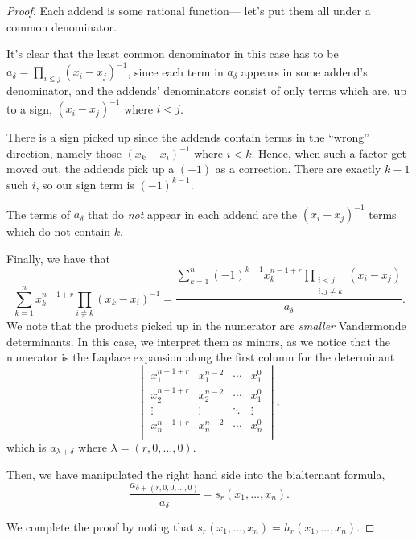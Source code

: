 \documentclass{article}
\begin{document}
\begin{proof}
    Each addend is some rational function--- let's put them all under a common denominator.

    It's clear that the least common denominator in this case has to be $a_\delta = \prod_{i\leq j}(x_i-x_j)^{-1}$, since each term in $a_\delta$ appears in some addend's denominator, and the addends' denominators consist of only terms which are, up to a sign, $(x_i-x_j)^{-1}$ where $i<j$.

    There is a sign picked up since the addends contain terms in the ``wrong'' direction, namely those $(x_k - x_i)^{-1}$ where $i < k$.
    Hence, when such a factor get moved out, the addends pick up a $(-1)$ as a correction. There are exactly $k-1$ such $i$, so our sign term is $(-1)^{k-1}$.

    The terms of $a_\delta$ that do \textit{not} appear in each addend are the $(x_i-x_j)^{-1}$ terms which do not contain $k$.

    Finally, we have that
    \[
        \sum_{k=1}^n x_k^{n-1+r}\prod_{i\neq k}(x_k-x_i)^{-1}
        =
        \frac{\displaystyle\sum_{k=1}^n (-1)^{k-1}x_k^{n-1+r}\prod_{\substack{i<j\\i,j\neq k}}(x_i-x_j)}{a_\delta}.
    \]
    We note that the products picked up in the numerator are \textit{smaller} Vandermonde determinants. In this case, we interpret them as minors, as we notice that the numerator is the Laplace expansion along the first column for the determinant
    \[
        \begin{vmatrix}
            x_1^{n-1+r} & x_1^{n-2} & \cdots & x_1^0 \\
            x_2^{n-1+r} & x_2^{n-2} & \cdots & x_1^0 \\
            \vdots & \vdots & \ddots & \vdots  \\
            x_n^{n-1+r} & x_n^{n-2} & \cdots & x_n^0 \\
        \end{vmatrix},
    \]
    which is $a_{\lambda + \delta}$ where $\lambda = (r,0,\ldots,0)$.

    Then, we have manipulated the right hand side into the bialternant formula,
    \[
        \frac{a_{\delta + (r,0,0,\ldots,0)}}{a_\delta} = s_r(x_1,\ldots,x_n).
    \]

    We complete the proof by noting that $s_r(x_1,\ldots,x_n) = h_r(x_1,\ldots,x_n)$.
\end{proof}
\end{document}
